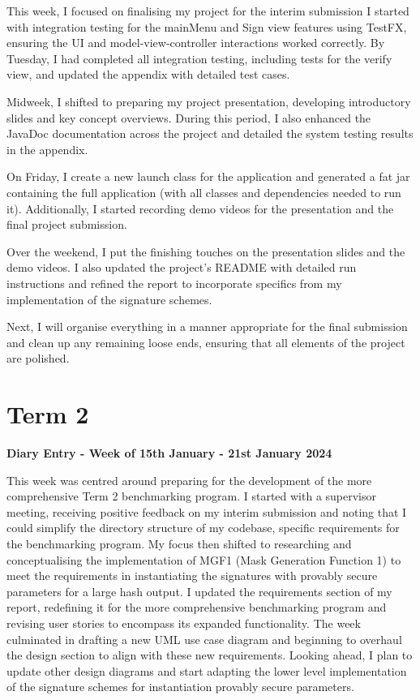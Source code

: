 \documentclass[]{final_report}
\theoremstyle{definition}
\begin{document}
This week, I focused on finalising my project for the interim submission I started with integration
testing for the mainMenu and Sign view features using TestFX, ensuring the UI and
model-view-controller interactions worked correctly. By Tuesday, I had completed all integration
testing, including tests for the verify view, and updated the appendix with detailed test cases.

Midweek, I shifted to preparing my project presentation, developing introductory slides and key
concept overviews. During this period, I also enhanced the JavaDoc documentation across the project
and detailed the system testing results in the appendix.

On Friday, I create a new launch class for the application and generated a fat jar containing the
full application (with all classes and dependencies needed to run it). Additionally, I started
recording demo videos for the presentation and the final project submission.

Over the weekend, I put the finishing touches on the presentation slides and the demo videos. I also
updated the project's README with detailed run instructions and refined the report to incorporate
specifics from my implementation of the signature schemes.

Next, I will organise everything in a manner appropriate for the final submission and clean up any
remaining loose ends, ensuring that all elements of the project are polished.

\section{Term 2}

\textbf{Diary Entry - Week of 15th January - 21st January 2024}

This week was centred around preparing for the development of the more comprehensive Term 2
benchmarking program. I started with a supervisor meeting, receiving positive feedback on my interim
submission and noting that I could simplify the directory structure of my codebase, specific
requirements for the benchmarking program. My focus then shifted to researching and conceptualising
the implementation of MGF1 (Mask Generation Function 1) to meet the requirements in instantiating
the signatures with provably secure parameters for a large hash output. I updated the requirements
section of my report, redefining it for the more comprehensive benchmarking program and revising
user stories to encompass its expanded functionality. The week culminated in drafting a new UML use
case diagram and beginning to overhaul the design section to align with these new requirements.
Looking ahead, I plan to update other design diagrams and start adapting the lower level
implementation of the signature schemes for instantiation provably secure parameters.
\end{document}
